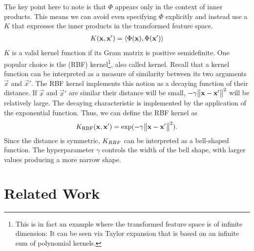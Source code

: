 \documentclass[
	fontsize=10pt, %
	twoside=false, %
	secnumdepth=1, %
]{kaobook}
\begin{document}
The key point here to note is that $\Phi$ appears only in the context of inner
products. This means we can avoid even specifying $\Phi$ explicitly and instead
use a  $K$ that expresses the inner products in the
transformed feature space.
\begin{align*}
  K(\mathbf{x}, \mathbf{x}') = \langle \Phi(\mathbf{x}), \Phi(\mathbf{x}') \rangle
\end{align*}
$K$ is a valid kernel function if its Gram matrix is positive semidefinite. One
popular choice is the  (RBF) kernel\footnote{This is in fact an example where the transformed feature space is of
  infinite dimension: It can be seen via Taylor expansion that \Krbf is based on
  an infinite sum of polynomial kernels.
}, also called  kernel. Recall that a kernel function can be
interpreted as a measure of similarity between its two arguments $\vec x$ and
$\vec x'$. The RBF kernel implements this notion as a decaying function of their
distance. If $\vec x$ and $\vec x'$ are similar their distance will be small, $-
\gamma \norm{\mathbf{x} - \mathbf{x}'}^2$ will be relatively large. The decaying
characteristic is implemented by the application of the exponential function.
Thus, we can define the RBF kernel as
\begin{align}
  K_{\text{RBF}} (\mathbf{x}, \mathbf{x}') = \exp( -\gamma \norm{\mathbf{x} - \mathbf{x}'}^2 ).
  \label{eq:rbf-kernel}
\end{align}
Since the distance is symmetric, $K_{RBF}$ can be interpreted as a bell-shaped
function.
The hyperparameter $\gamma$ controls the width of the bell shape, with
larger values producing a more narrow shape. 




\chapter{Related Work}
\label{sec:related-work}
\end{document}
